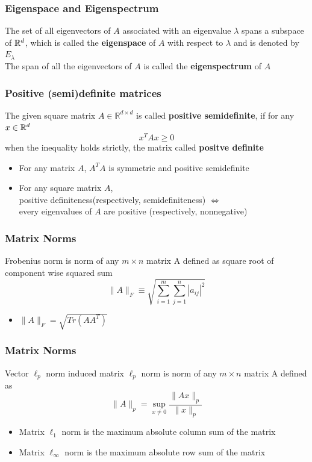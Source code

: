 \begin{frame}\frametitle{Eigenspace and Eigenspectrum}
    The set of all eigenvectors of $A$ associated with an eigenvalue $\lambda$ spans a subspace of ${\mathbb R}^{d}$,
    which is called the \textbf{eigenspace} of $A$ with respect to $\lambda$ and is denoted by $E_\lambda$\\
    \vspace*{10mm}
    The span of all the eigenvectors of $A$ is called the \textbf{eigenspectrum} of $A$
\end{frame}

\begin{frame}\frametitle{Positive (semi)definite matrices}
    The given square matrix $A\in\mathbb{R}^{d\times d}$ is called \textbf{positive semidefinite}, if for any $x\in{\mathbb R}^{d}$
    \begin{equation*}
        x^TAx\geq0
    \end{equation*}
    when the inequality holds strictly, the matrix called \textbf{positve definite}
    \vspace*{10mm}
    \begin{itemize}
        \item  For any matrix $A$, $A^TA$ is symmetric and positive semidefinite
        \item  For any square matrix $A$,\\ positive definiteness(respectively, semidefiniteness) $\Longleftrightarrow$ \\every eigenvalues of $A$ are positive (respectively, nonnegative)
        
    \end{itemize}
\end{frame}

\begin{frame}\frametitle{Matrix Norms}
    Frobenius norm is norm of any $m\times n$ matrix A defined as square root of component wise squared sum 
    \begin{equation*}
        \|A\|_F \equiv \sqrt{\sum_{i=1}^m \sum_{j=1}^n\left|a_{i j}\right|^2} 
    \end{equation*}
    \begin{itemize}
        \item $\|A\|_F = \sqrt{Tr(AA^T)}$
    \end{itemize}
\end{frame}

\begin{frame}\frametitle{Matrix Norms}
    Vector $\ell_p$ norm induced matrix $\ell_p$ norm is norm of any $m\times n$ matrix A defined as 
    \begin{equation*}
        \|A\|_p=\sup _{x \neq 0} \frac{\|A x\|_p}{\|x\|_p}
    \end{equation*}
    \begin{itemize}
        \item Matrix $\ell_1$ norm is the maximum absolute column sum of the matrix
        \item Matrix $\ell_\infty$ norm is the maximum absolute row sum of the matrix
    \end{itemize}
\end{frame}

